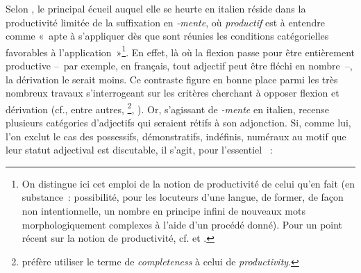 \documentclass[output=paper]{langsci/langscibook}
\begin{document}
Selon %
\citet{Scalise90}%
%
, le principal écueil auquel elle se heurte en italien réside dans la productivité limitée de la suffixation en \emph{-mente}, où \emph{productif} est à entendre comme «~apte à s'appliquer dès que sont réunies les conditions catégorielles favorables à l'application~»\footnote{On distingue ici cet emploi de la notion de productivité de celui qu'en fait %
\citet{Schultink1961} %
%
(en substance~: possibilité, pour les locuteurs d'une langue, de former, de façon non intentionnelle, un nombre en principe infini de nouveaux mots morphologiquement complexes à l'aide d'un procédé donné). Pour un point récent sur la notion de productivité, cf. %
\citet{Gaeta15} %
%
et %
\citet{Dal16}%
%
.}. En effet, là où la flexion passe pour être entièrement productive --~par exemple, en français, tout adjectif peut être fléchi en nombre~--, la dérivation le serait moins. Ce contraste figure en bonne place parmi les très nombreux travaux s'interrogeant sur les critères cherchant à opposer flexion et dérivation (cf., entre autres, %
\citealt{Dressler89,Scalise1988,Haspelmath1996,Blevins2001,Kilani-Schoch05,Stump05}%
%
\footnote{%
\citet[54]{Stump05} %
%
préfère utiliser le terme de \emph{completeness} à celui de \emph{productivity}.}, %
\citealt{Hacken14,Stekauer15}%
%
). Or, s'agissant de \emph{-mente} en italien, %
\citet{Scalise90} %
%
 recense plusieurs catégories d'adjectifs qui seraient rétifs à son adjonction. Si, comme lui, l'on exclut le cas des possessifs, démonstratifs, indéfinis, numéraux au motif que leur statut adjectival est discutable, il s'agit, pour l'essentiel %
\citep[le marquage par un astérisque est le fait de ][]{Scalise90}%
%
~:
\end{document}
